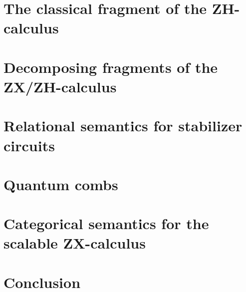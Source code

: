 \documentclass[12pt]{ociamthesis}  %
\begin{document}




\chapter{The classical fragment of the ZH-calculus}



\chapter{Decomposing fragments of the ZX/ZH-calculus}


\chapter{Relational semantics for stabilizer circuits}



\chapter{Quantum combs}
\chapter{Categorical semantics for the scalable ZX-calculus}

\chapter{Conclusion}


 

\end{document}
